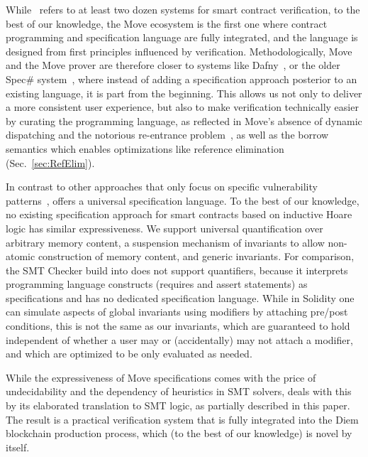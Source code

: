 While~\cite{CONTRACT_VERIFICATION} refers to at least two dozen systems for
smart contract verification, to the best of our knowledge, the Move ecosystem is
the first one where contract programming and specification language are fully
integrated, and the language is designed from first principles influenced by
verification. Methodologically, Move and the Move prover are therefore closer to
systems like Dafny~\cite{DAFNY}, or the older Spec\# system~\cite{SPECSHARP},
where instead of adding a specification approach posterior to an existing
language, it is part from the beginning. This allows us not only to deliver a
more consistent user experience, but also to make verification technically
easier by curating the programming language, as reflected in Move's absence of
dynamic dispatching and the notorious re-entrance problem~\cite{REENTRANCE}, as
well as the borrow semantics which enables optimizations like reference
elimination (Sec.~\ref{sec:RefElim}).


In contrast to other approaches that only focus on specific vulnerability
patterns~\cite{mythril,oyente,maian,securify}, \MVP offers a universal
specification language. To the best of our knowledge, no existing specification
approach for smart contracts based on inductive Hoare logic has similar
expressiveness. We support universal quantification over arbitrary memory
content, a suspension mechanism of invariants to allow non-atomic construction
of memory content, and generic invariants.  For comparison, the SMT Checker
build into \solidity \cite{solidity} does not support quantifiers, because it
interprets programming language constructs (requires and assert statements) as
specifications and has no dedicated specification language. While in Solidity
one can simulate aspects of global invariants using modifiers by attaching
pre/post conditions, this is not the same as our invariants, which are
guaranteed to hold independent of whether a user may or (accidentally) may not
attach a modifier, and which are optimized to be only evaluated as needed.

While the expressiveness of Move specifications comes with the price of
undecidability and the dependency of heuristics in SMT solvers, \MVP deals with
this by its elaborated translation to SMT logic, as
partially described in this paper. The result is a practical verification system
that is fully integrated into the Diem blockchain production process, which (to
the best of our knowledge) is novel by itself.


